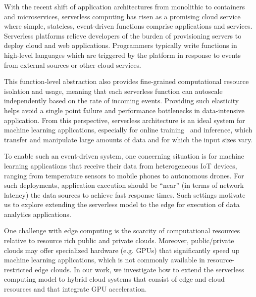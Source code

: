 With the recent shift of application architectures from monolithic to containers and microservices, serverless computing has risen as a promising cloud service where simple, stateless, event-driven functions comprise applications and services. 
Serverless platforms relieve
developers of the burden of provisioning servers to deploy cloud and web applications. Programmers typically write functions in high-level languages which are triggered by the platform in response to events from external sources or other cloud services. 

This function-level abstraction also provides fine-grained computational resource isolation and usage, meaning that each serverless function can autoscale independently based on the rate of incoming events. Providing such elasticity helps avoid a single point failure and performance bottlenecks in data-intensive application. From this perspective, serverless architecture is an ideal system for machine learning applications, especially for online training~\cite{ref:online} and inference, which transfer and manipulate large amounts of data and for which the input sizes vary.

To enable such an event-driven system, one concerning situation is for machine learning applications that receive their data from  heterogeneous IoT devices, ranging from temperature sensors to mobile phones to autonomous drones. For such deployments, application execution should be ``near'' (in terms of network latency) the data sources to achieve fast response times. Such settings motivate us to explore extending the serverless model to the edge for execution of data analytics applications.

One challenge with edge computing is the scarcity of computational resources relative to resource rich public and private clouds.  Moreover, public/private clouds may offer specialized hardware (e.g. GPUs) that significantly speed up machine learning applications, which is not commonly available in resource-restricted edge clouds.
In our work, we investigate how to extend the serverless computing model to hybrid cloud systems that consist of edge and cloud resources and that integrate GPU acceleration. 


